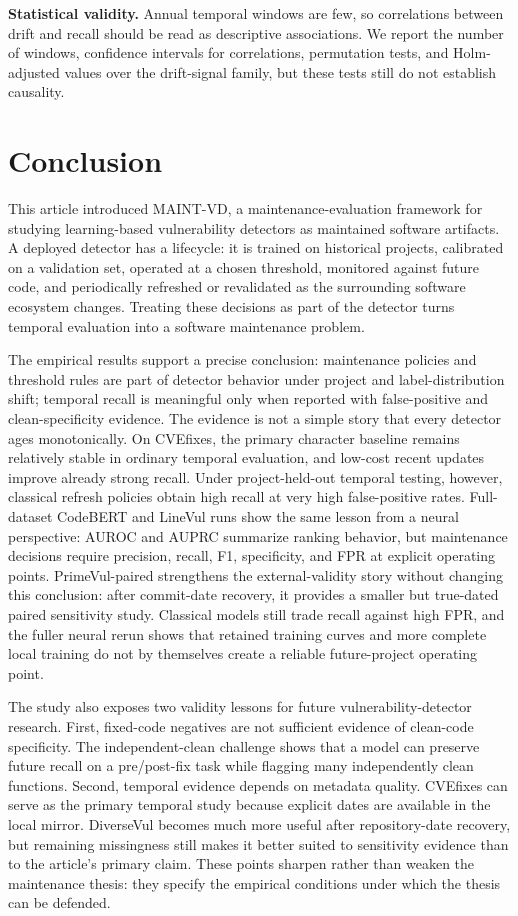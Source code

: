 \documentclass[a4paper,fleqn]{cas-dc}
\begin{document}
\textbf{Statistical validity.} Annual temporal windows are few, so correlations
between drift and recall should be read as descriptive associations. We report
the number of windows, confidence intervals for correlations, permutation tests,
and Holm-adjusted values over the drift-signal family, but these tests still do
not establish causality.

\section{Conclusion}

This article introduced MAINT-VD, a maintenance-evaluation framework for
studying learning-based vulnerability detectors as maintained software
artifacts. A deployed detector has a lifecycle: it is
trained on historical projects, calibrated on a validation set, operated at a
chosen threshold, monitored against future code, and periodically refreshed or
revalidated as the surrounding software ecosystem changes. Treating these
decisions as part of the detector turns temporal evaluation into a software
maintenance problem.

The empirical results support a precise conclusion: maintenance policies and
threshold rules are part of detector behavior under project and
label-distribution shift; temporal recall is meaningful only when reported with
false-positive and clean-specificity evidence. The evidence is not a simple
story that every detector ages monotonically. On
CVEfixes, the primary character baseline remains relatively stable in ordinary
temporal evaluation, and low-cost recent updates improve already strong recall.
Under project-held-out temporal testing, however, classical refresh policies
obtain high recall at very high false-positive rates. Full-dataset CodeBERT and
LineVul runs show the same lesson from a neural perspective: AUROC and AUPRC
summarize ranking behavior, but maintenance decisions require precision, recall,
F1, specificity, and FPR at explicit operating points.
PrimeVul-paired strengthens the external-validity story without changing this
conclusion: after commit-date recovery, it provides a smaller but true-dated
paired sensitivity study. Classical models still trade recall against high FPR,
and the fuller neural rerun shows that retained training curves and more
complete local training do not by themselves create a reliable future-project
operating point.

The study also exposes two validity lessons for future vulnerability-detector
research. First, fixed-code negatives are not sufficient evidence of clean-code
specificity. The independent-clean challenge shows that a model can preserve
future recall on a pre/post-fix task while flagging many independently clean
functions. Second, temporal evidence depends on metadata quality. CVEfixes can
serve as the primary temporal study because explicit dates are available in the
local mirror. DiverseVul becomes much more useful after repository-date
recovery, but remaining missingness still makes it better suited to sensitivity
evidence than to the article's primary claim. These points sharpen rather than
weaken the maintenance thesis: they specify the empirical conditions under
which the thesis can be defended.
\end{document}
